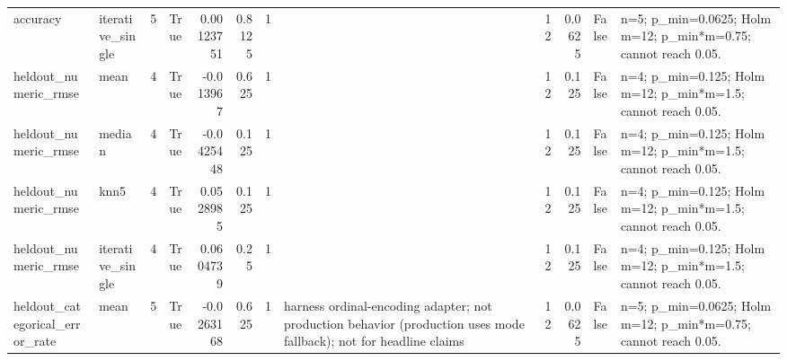 \begin{table}[ht]
{\begin{tabular}{llrlrrrlrrll}
 accuracy                       & iterative\_single &            5 & True                &      0.00123751  &    0.8125 &     1    &                                                                                                                    &                             12 &                             0.0625 & False                       & n=5; p\_min=0.0625; Holm m=12; p\_min*m=0.75; cannot reach 0.05. \\
 heldout\_numeric\_rmse           & mean             &            4 & True                &     -0.013967    &    0.625  &     1    &                                                                                                                    &                             12 &                             0.125  & False                       & n=4; p\_min=0.125; Holm m=12; p\_min*m=1.5; cannot reach 0.05.   \\
 heldout\_numeric\_rmse           & median           &            4 & True                &     -0.0425448   &    0.125  &     1    &                                                                                                                    &                             12 &                             0.125  & False                       & n=4; p\_min=0.125; Holm m=12; p\_min*m=1.5; cannot reach 0.05.   \\
 heldout\_numeric\_rmse           & knn5             &            4 & True                &      0.0528985   &    0.125  &     1    &                                                                                                                    &                             12 &                             0.125  & False                       & n=4; p\_min=0.125; Holm m=12; p\_min*m=1.5; cannot reach 0.05.   \\
 heldout\_numeric\_rmse           & iterative\_single &            4 & True                &      0.0604739   &    0.25   &     1    &                                                                                                                    &                             12 &                             0.125  & False                       & n=4; p\_min=0.125; Holm m=12; p\_min*m=1.5; cannot reach 0.05.   \\
 heldout\_categorical\_error\_rate & mean             &            5 & True                &     -0.0263168   &    0.625  &     1    & harness ordinal-encoding adapter; not production behavior (production uses mode fallback); not for headline claims &                             12 &                             0.0625 & False                       & n=5; p\_min=0.0625; Holm m=12; p\_min*m=0.75; cannot reach 0.05. \\

\end{tabular}}
\end{table}
